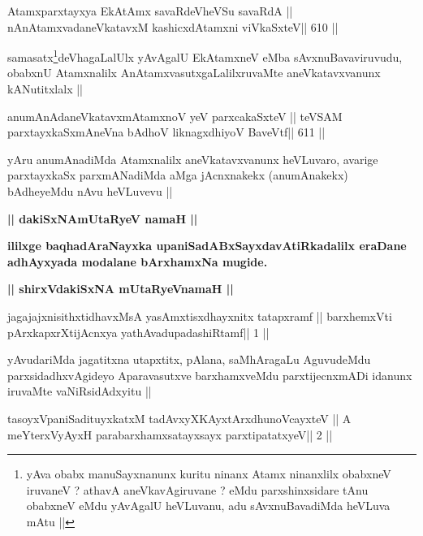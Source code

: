 \begin{shl}
Atamxparxtayxya EkAtAmx savaRdeVheVSu savaRdA ||
nAnAtamxvadaneVkatavxM kashicxdAtamxni viVkaSxteV\hfill || 610 ||
\end{shl}

\begin{artha}
samasatx\footnote[1]{yAva obabx manuSayxnanunx kuritu ninanx Atamx
  ninanxlilx obabxneV iruvaneV ? athavA aneVkavAgiruvane ? eMdu
  parxshinxsidare tAnu obabxneV eMdu yAvAgalU heVLuvanu, adu
  sAvxnuBavadiMda heVLuva mAtu ||}deVhagaLalUlx yAvAgalU EkAtamxneV eMba
sAvxnuBavaviruvudu, obabxnU Atamxnalilx AnAtamxvasutxgaLalilxruvaMte
aneVkatavxvanunx kANutitxlalx ||
\end{artha}

\begin{shl}
anumAnAdaneVkatavxmAtamxnoV yeV parxcakaSxteV ||
teVSAM parxtayxkaSxmAneVna bAdhoV liknagxdhiyoV BaveVtf\hfill || 611 ||
\end{shl}

\begin{artha}
yAru anumAnadiMda Atamxnalilx aneVkatavxvanunx heVLuvaro, avarige
parxtayxkaSx parxmANadiMda aMga jAcnxnakekx (anumAnakekx) bAdheyeMdu
nAvu heVLuvevu ||
\end{artha}


\begin{center}
{\Large{\textbf{|| dakiSxNAmUtaRyeV namaH ||}}}

{\textbf{ililxge baqhadAraNayxka upaniSadABxSayxdavAtiRkadalilx eraDane
adhAyxyada modalane bArxhamxNa mugide.}}
\end{center}

\begin{center}
{\large{\textbf{|| shirxVdakiSxNA mUtaRyeVnamaH ||}}}
\end{center}

\begin{shl}
jagajajxnisithxtidhavxMsA yasAmxtisxdhayxnitx tatapxramf ||
barxhemxVti pArxkapxrXtijAcnxya yathAvadupadashiRtamf\hfill || 1 ||
\end{shl}

\begin{artha}
yAvudariMda jagatitxna utapxtitx, pAlana, saMhAragaLu AguvudeMdu
parxsidadhxvAgideyo Aparavasutxve barxhamxveMdu parxtijecnxmADi
idanunx iruvaMte vaNiRsidAdxyitu || 
\end{artha}

\begin{shl}
tasoyxVpaniSadituyxkatxM tadAvxyXKAyx\s tArxdhunoVcayxteV ||
A meYterxVyAyxH parabarxhamxsatayxsayx parxtipatatxyeV\hfill || 2 ||
\end{shl}

